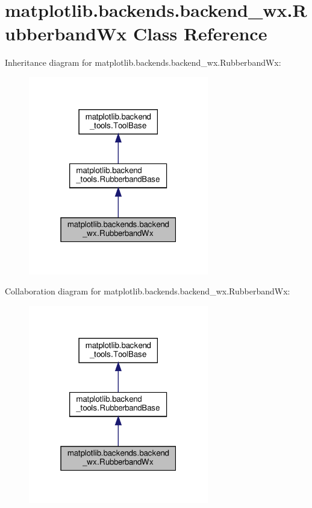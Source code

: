 \hypertarget{classmatplotlib_1_1backends_1_1backend__wx_1_1RubberbandWx}{}\section{matplotlib.\+backends.\+backend\+\_\+wx.\+Rubberband\+Wx Class Reference}
\label{classmatplotlib_1_1backends_1_1backend__wx_1_1RubberbandWx}


Inheritance diagram for matplotlib.\+backends.\+backend\+\_\+wx.\+Rubberband\+Wx\+:
\nopagebreak
\begin{figure}[H]
\begin{center}
\leavevmode
\includegraphics[width=223pt]{classmatplotlib_1_1backends_1_1backend__wx_1_1RubberbandWx__inherit__graph}
\end{center}
\end{figure}


Collaboration diagram for matplotlib.\+backends.\+backend\+\_\+wx.\+Rubberband\+Wx\+:
\nopagebreak
\begin{figure}[H]
\begin{center}
\leavevmode
\includegraphics[width=223pt]{classmatplotlib_1_1backends_1_1backend__wx_1_1RubberbandWx__coll__graph}
\end{center}
\end{figure}
